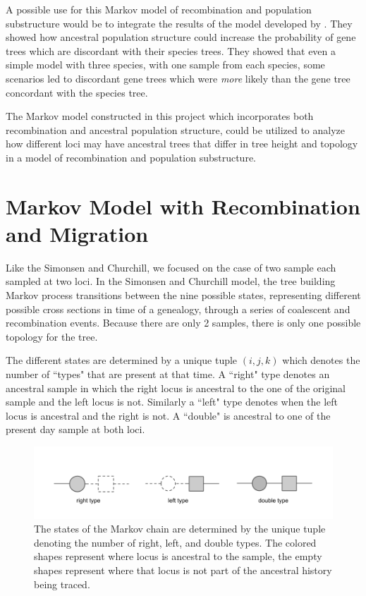 \documentclass[11pt,oneside]{amsart}
\begin{document}
A possible use for this Markov model of recombination and population substructure would be to integrate the results of the model developed by \cite{SlatkinPollack2008}. They showed how ancestral population structure could increase the probability of  gene trees which are discordant with their species trees. They showed that even a simple model with three species, with one sample from each species, some scenarios led to discordant gene trees which were \textit{more} likely than the gene tree concordant with the species tree.

The Markov model constructed in this project which incorporates both recombination and ancestral population structure, could be utilized to analyze how different loci may have ancestral trees that differ in tree height and topology in a model of recombination and population substructure.

\section{Markov Model with Recombination and Migration}

Like the Simonsen and Churchill, we focused on the case of two sample each sampled at two loci. In the Simonsen and Churchill model, the tree building Markov process transitions between the nine possible states, representing different possible cross sections in time of a genealogy, through a series of coalescent and recombination events. Because there are only 2 samples, there is only one possible topology for the tree.

The different states are determined by a unique tuple $(i, j, k)$ which denotes the number of ``types" that are present at that time. A ``right" type denotes an ancestral sample in which the right locus is ancestral to the one of the original sample and the left locus is not. Similarly a ``left" type denotes when the left locus is ancestral and the right is not. A ``double" is ancestral to one of the present day sample at both loci.

\begin{figure}[ht]
\centering
\includegraphics[width=1.0\textwidth]{Terminology.png}
\caption{The states of the Markov chain are determined by the unique tuple denoting the number of right, left, and double types. The colored shapes represent where locus is ancestral to the sample, the empty shapes represent where that locus is not part of the ancestral history being traced.}
\label{Figure: recomb}
\end{figure}
\end{document}
